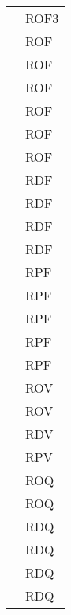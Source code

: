 \begin{longtable}{| p{5cm} | p{5cm} |}
		\rowcolor{LightGray}
		\multirow[t]{23}{*}{\cellcolor{LightGray}}{Capitolato} 
				 & ROF3 \\
				\rowcolor{LightGray} &	ROF \\
				\rowcolor{LightGray} &	ROF \\
				\rowcolor{LightGray} &	ROF \\
				\rowcolor{LightGray} &	ROF \\
				\rowcolor{LightGray} &	ROF \\
				\rowcolor{LightGray} &	ROF \\
				\rowcolor{LightGray} &	RDF \\
				\rowcolor{LightGray} &	RDF \\
				\rowcolor{LightGray} &	RDF \\
				\rowcolor{LightGray} &	RDF \\
				\rowcolor{LightGray} &	RPF \\
				\rowcolor{LightGray} &	RPF \\
				\rowcolor{LightGray} &	RPF \\
				\rowcolor{LightGray} &	RPF \\
				\rowcolor{LightGray} &	RPF \\
				\rowcolor{LightGray} &	ROV \\
				\rowcolor{LightGray} &	ROV \\
				\rowcolor{LightGray} &	RDV \\
				\rowcolor{LightGray} &	RPV \\
				\rowcolor{LightGray} &	ROQ \\
				\rowcolor{LightGray} &	ROQ\\
				\rowcolor{LightGray} &	RDQ\\
				\rowcolor{LightGray} &	RDQ \\
				\rowcolor{LightGray} &	RDQ \\
				\rowcolor{LightGray} &	RDQ \\
		

\end{longtable}
